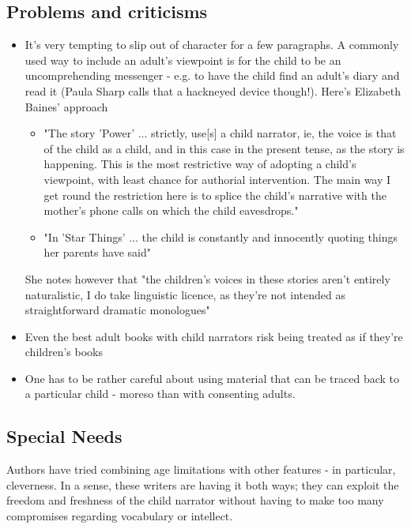 \documentclass[11pt]{article}
\begin{document}
\subsection*{Problems and criticisms}
\begin{itemize}


\item It's very tempting to slip out of character for a few paragraphs. 
A commonly used way to include an adult's viewpoint is for the child to be an uncomprehending messenger - e.g. to have the child find an adult's diary and read it (Paula Sharp calls that a hackneyed device though!). Here's Elizabeth Baines' approach
\begin{itemize}
\item  "The story 'Power' ... strictly, use[s] a child narrator, ie, the voice is that of the child as a child, and in this case in the present tense, as the story is happening. This is the most restrictive way of adopting a child's viewpoint, with least chance for authorial intervention. The main way I get round the restriction here is to splice the child's narrative with the mother's phone calls on which the child eavesdrops."
\item  "In 'Star Things' ... the child is constantly and innocently quoting things her parents have said"
\end{itemize}
She notes however that "the children's voices in these stories aren't entirely
  naturalistic, I do take linguistic licence, as they're not intended as
  straightforward dramatic monologues"

\item Even the best adult books with child narrators
risk being treated as if they're children's books

\item One has to be rather careful about using material that can be traced back
  to a particular child - moreso than with consenting adults.
\end{itemize}

\subsection*{Special Needs}

Authors have tried combining age limitations with other features - in particular, cleverness.
 In a sense, these writers are having it both ways; they can exploit the freedom and freshness of the child narrator without having to make too many compromises regarding vocabulary or intellect.
\end{document}
